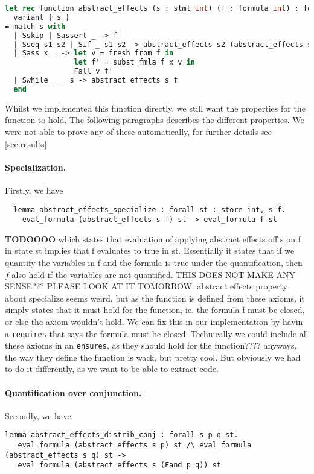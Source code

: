 \begin{lstlisting}[caption={Implementation of the \texttt{abstract\_effects} function},label={lst:abstracteff},language=sml]
let rec function abstract_effects (s : stmt int) (f : formula int) : formula int
  variant { s }
= match s with
  | Sskip | Sassert _ -> f
  | Sseq s1 s2 | Sif _ s1 s2 -> abstract_effects s2 (abstract_effects s1 f)
  | Sass x _ -> let v = fresh_from f in
                let f' = subst_fmla f x v in
                Fall v f'
  | Swhile _ _ s -> abstract_effects s f
  end
\end{lstlisting}

Whilst we implemented this function directly, we still want the properties for the function to hold.
The following paragraphs describes the different properties. We were not able to prove any of these automatically, for further details see \ref{sec:results}.

\paragraph{Specialization.} Firstly, we have

\begin{lstlisting}
  lemma abstract_effects_specialize : forall st : store int, s f.
    eval_formula (abstract_effects s f) st -> eval_formula f st
\end{lstlisting}

\textbf{TODOOOO}
which states that evaluation of applying abstract effects off s on f in state st implies that f evaluates to true in st. Essentially it states that if we quantify the variables in f and the formula is true under the quantification, then $f$ also hold if the variables are not quantified.
THIS DOES NOT MAKE ANY SENSE??? PLEASE LOOK AT IT TOMORROW.
abstract effects property about specialize seems weird, but as the function is defined
from these axioms, it simply states that it must hold for the function, ie. the formula f
must be closed, or else the axiom wouldn't hold.
We can fix this in our implementation by havin a \texttt{requires} that says the formula
must be closed.
Technically we could include all these axioms in an \texttt{ensures}, as they should hold
for the function???? anyways, the way they define the function is wack, but pretty cool.
But obviously we had to do it differently, as we want to be able to extract code.

\paragraph{Quantification over conjunction.}
Secondly, we have
\begin{lstlisting}
lemma abstract_effects_distrib_conj : forall s p q st.
   eval_formula (abstract_effects s p) st /\ eval_formula (abstract_effects s q) st ->
   eval_formula (abstract_effects s (Fand p q)) st
 \end{lstlisting}

